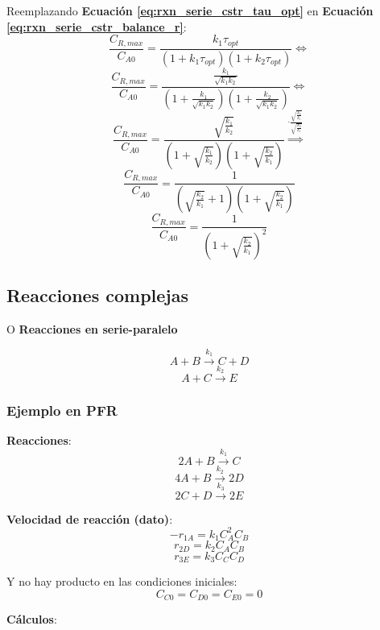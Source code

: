         Reemplazando \textbf{Ecuación \ref{eq:rxn_serie_cstr_tau_opt}} en \textbf{Ecuación \ref{eq:rxn_serie_cstr_balance_r}}:
        \[\frac{C_{R,max}}{C_{A0}} = \frac{k_{1}{\tau}_{opt}}{\left ( 1 + k_{1}{\tau}_{opt} \right ) \left ( 1 + k_{2}{\tau}_{opt} \right )} \Leftrightarrow\]
        \[\frac{C_{R,max}}{C_{A0}} = \frac{\frac{k_{1}}{\sqrt{k_{1}k_{2}}}}{\left ( 1 + \frac{k_{1}}{\sqrt{k_{1}k_{2}}} \right ) \left ( 1 + \frac{k_{2}}{\sqrt{k_{1}k_{2}}} \right )} \Leftrightarrow\]
        \[\frac{C_{R,max}}{C_{A0}} = \frac{\sqrt{\frac{k_{1}}{k_{2}}}}{\left ( 1 + \sqrt{\frac{k_{1}}{k_{2}}} \right ) \left ( 1 + \sqrt{\frac{k_{2}}{k_{1}}} \right )} \overset{\cdot \frac{\sqrt{\frac{k_{2}}{k_{1}}}}{\sqrt{\frac{k_{2}}{k_{1}}}}}{\Rightarrow}\]
        \[\frac{C_{R,max}}{C_{A0}} = \frac{1}{\left (\sqrt{\frac{k_{2}}{k_{1}}} + 1 \right ) \left (1 + \sqrt{\frac{k_{2}}{k_{1}}} \right )}\]
        \begin{equation}
        \label{eq:rxn_serie_cstr_c_r_max}
            \frac{C_{R,max}}{C_{A0}} = \frac{1}{\left ( 1 + \sqrt{\frac{k_{2}}{k_{1}}}\right )^{2}}
        \end{equation}
    
    \subsection{Reacciones complejas}
    
    O \textbf{Reacciones en serie-paralelo}
    
    \[A + B \overset{k_{1}}{\rightarrow} C + D\]
    \[A + C \overset{k_{2}}{\rightarrow} E\]
    
        \subsubsection{Ejemplo en PFR}
        
        \textbf{Reacciones}:
        \[2A + B \overset{k_{1}}{\rightarrow} C\]
        \[4A + B \overset{k_{2}}{\rightarrow} 2D\]
        \[2C + D \overset{k_{3}}{\rightarrow} 2E\]
        
        \textbf{Velocidad de reacción (dato)}:
        \[-r_{1A} = k_{1}{C}_{A}^{2}{C}_{B}\]
        \[r_{2D} = k_{2}{C}_{A}{C}_{B}\]
        \[r_{3E} = k_{3}{C}_{C}{C}_{D}\]
        
        Y no hay producto en las condiciones iniciales:
        \[C_{C0} = C_{D0} = C_{E0} = 0\]
        
        \textbf{Cálculos}:
        
